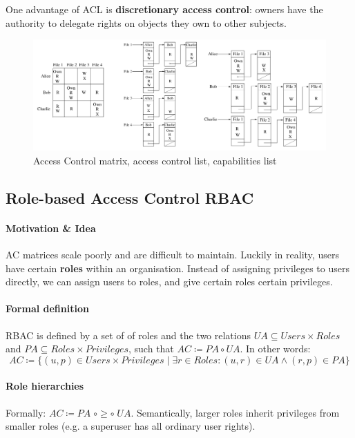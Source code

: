 One advantage of ACL is \textbf{discretionary access control}: owners have the authority to delegate rights on objects they own to other subjects.

\begin{figure}[h]
    \centering
    \includegraphics[width=16cm]{images/ch11-ac-matrix-mechanism.png}
    \caption{Access Control matrix, access control list, capabilities list}
    \label{fig:ac-matrix-mechanism}
\end{figure}


\subsection{Role-based Access Control RBAC}

\paragraph{Motivation \& Idea} AC matrices scale poorly and are difficult to maintain. Luckily in reality, users have certain \textbf{roles} within an organisation. Instead of assigning privileges to users directly, we can assign users to roles, and give certain roles certain privileges.

\paragraph{Formal definition} RBAC is defined by a set of of roles and the two relations $UA \subseteq Users \times Roles$ and $PA \subseteq Roles \times Privileges$, such that $AC \coloneqq PA \circ UA$. In other words:
$$ AC \coloneqq \big\{ (u,p) \in Users \times Privileges \; | \; \exists r \in Roles : (u, r) \in UA \wedge (r, p) \in PA \big\} $$

\paragraph{Role hierarchies} Formally: $AC \coloneqq PA \; \circ \geq \circ \; UA$. Semantically, larger roles inherit privileges from smaller roles (e.g. a superuser has all ordinary user rights).

